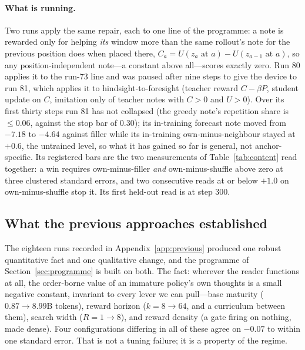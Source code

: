 \documentclass{article} %
\begin{document}
\paragraph{What is running.} Two runs apply the same repair, each to one line of the programme: a note is
rewarded only for helping \emph{its} window more than the same rollout's note for the previous position
does when placed there, $C_a = U(z_a \text{ at } a) - U(z_{a-1} \text{ at } a)$, so any position-independent
note---a constant above all---scores exactly zero. Run 80 applies it to the run-73 line and was paused after
nine steps to give the device to run 81, which applies it to hindsight-to-foresight (teacher reward
$C - \beta P$, student update on $C$, imitation only of teacher notes with $C > 0$ and $U > 0$). Over its first
thirty steps run 81 has not collapsed (the greedy note's repetition share is $\le 0.06$, against the stop bar
of $0.30$); its in-training forecast note moved from $-7.18$ to $-4.64$ against filler while its in-training
own-minus-neighbour stayed at $+0.6$, the untrained level, so what it has gained so far is general, not
anchor-specific. Its registered bars are the two measurements of Table~\ref{tab:content} read together: a
win requires own-minus-filler \emph{and} own-minus-shuffle above zero at three clustered standard errors,
and two consecutive reads at or below $+1.0$ on own-minus-shuffle stop it. Its first held-out read is at step
$300$.

\subsection{What the previous approaches established}
\label{sec:established}

 The eighteen runs recorded in Appendix~\ref{app:previous} produced one robust quantitative fact and one qualitative change, and the programme of Section~\ref{sec:programme} is built on both. The fact: wherever the reader functions at all, the order-borne value of an immature policy's own thoughts is a small negative constant, invariant to every lever we can pull---base maturity ($0.87 \to 8.99$B tokens), reward horizon ($k{=}8 \to 64$, and a curriculum between them), search width ($R{=}1 \to 8$), and reward density (a gate firing on nothing, made dense). Four configurations differing in all of these agree on $-0.07$ to within one standard error. That is not a tuning failure; it is a property of the regime.
\end{document}
